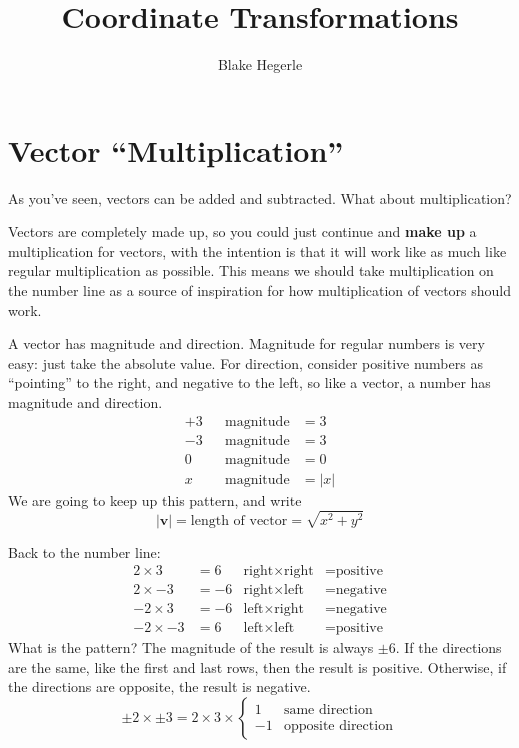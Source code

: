 \documentclass{article}
\title{Coordinate Transformations}
\author{Blake Hegerle}
\renewcommand{\vec}[1]{\boldsymbol{#1}}
\begin{document}
\section*{Vector ``Multiplication''}

As you've seen, vectors can be added and subtracted. What about multiplication?

Vectors are completely made up, so you could just continue and \textbf{make 
up} a multiplication for vectors, with the intention is that it will work
like as much like regular multiplication as possible. 
This means we should take multiplication on the number line as a source of 
inspiration for how multiplication of vectors should work.

A vector has magnitude and direction. Magnitude for regular numbers is very easy:
just take the absolute value. For direction, consider positive numbers as
``pointing'' to the right, and negative to the left, so like a vector,
a number has magnitude and direction.
\begin{align*}
    +3 && \text{magnitude} &= 3\\
    -3 && \text{magnitude} &= 3\\
    0 && \text{magnitude} &= 0\\
    x && \text{magnitude} &=|x|
\end{align*}
We are going to keep up this pattern, and write
\[
    |\vec{v}| = \text{length of vector} = \sqrt{x^2+y^2}
\]

Back to the number line:
\begin{align*}
     2\times 3 &= 6 & \text{right} \times \text{right} &= \text{positive}\\
     2\times -3 &= -6 & \text{right} \times \text{left} &= \text{negative}\\
     -2\times 3 &= -6 & \text{left} \times \text{right} &= \text{negative}\\
     -2\times -3 &= 6 & \text{left} \times \text{left} &= \text{positive}
\end{align*}
What is the pattern? The magnitude of the result is always $\pm 6$. If the 
directions are the same,
like the first and last rows, then the result is positive. 
Otherwise, if the directions are opposite, the result is negative.
\begin{equation}
    \label{mult-ex-1}
    \pm 2 \times \pm 3 = 2 \times 3 \times 
    \begin{cases}
        1 & \text{same direction} \\
        -1 & \text{opposite direction}
    \end{cases}
\end{equation}
\end{document}
